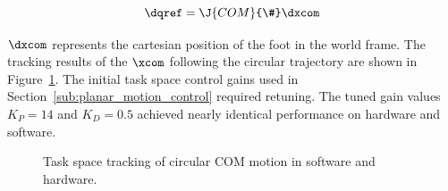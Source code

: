 \begin{equation}
	\dqref = \J{COM}{\#} \dxcom
	\label{eq:jcomcirc}
\end{equation}

$\dxcom$ represents the cartesian position of the foot in the world frame. The tracking results of the $\xcom$ following the circular trajectory are shown in Figure~\ref{fig:comcirctracking}. The initial task space control gains used in Section~\ref{sub:planar_motion_control} required retuning. The tuned gain values $K_P = 14$ and $K_D = 0.5$ achieved nearly identical performance on hardware and software. 

\begin{figure}[!t]
	\begin{center}
	\end{center}
  	\caption{Task space tracking of circular COM motion in software and hardware.}
	\label{fig:comcirctracking}
\end{figure} 

